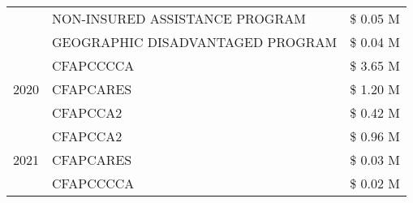 \begin{tabular}{llr}
 & NON-INSURED ASSISTANCE PROGRAM & \$ 0.05 M \\
 & GEOGRAPHIC DISADVANTAGED PROGRAM & \$ 0.04 M \\
\cline{1-3}
\multirow[t]{3}{*}{2020} & CFAPCCCCA & \$ 3.65 M \\
 & CFAPCARES & \$ 1.20 M \\
 & CFAPCCA2 & \$ 0.42 M \\
\cline{1-3}
\multirow[t]{3}{*}{2021} & CFAPCCA2 & \$ 0.96 M \\
 & CFAPCARES & \$ 0.03 M \\
 & CFAPCCCCA & \$ 0.02 M \\
\cline{1-3}
\bottomrule
\end{tabular}

